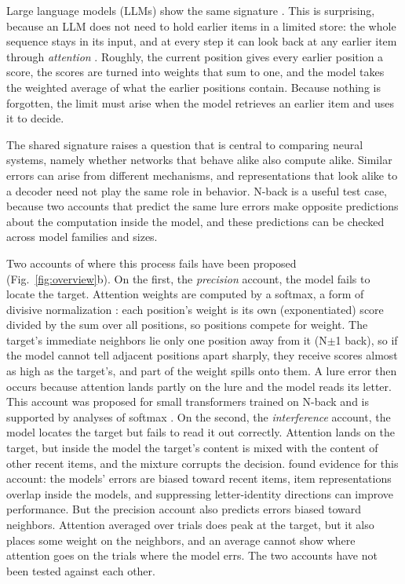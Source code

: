 \documentclass{article}
\begin{document}
Large language models (LLMs) show the same signature \citep{gong2024chatgpt,hu2025nback,xiong2026superposition}. This is surprising, because an LLM does not need to hold earlier items in a limited store: the whole sequence stays in its input, and at every step it can look back at any earlier item through \emph{attention} \citep{vaswani2017attention}. Roughly, the current position gives every earlier position a score, the scores are turned into weights that sum to one, and the model takes the weighted average of what the earlier positions contain. Because nothing is forgotten, the limit must arise when the model retrieves an earlier item and uses it to decide.

The shared signature raises a question that is central to comparing neural systems, namely whether networks that behave alike also compute alike. Similar errors can arise from different mechanisms, and representations that look alike to a decoder need not play the same role in behavior. N-back is a useful test case, because two accounts that predict the same lure errors make opposite predictions about the computation inside the model, and these predictions can be checked across model families and sizes.

Two accounts of where this process fails have been proposed (Fig.~\ref{fig:overview}b). On the first, the \emph{precision} account, the model fails to locate the target. Attention weights are computed by a softmax, a form of divisive normalization \citep{carandini2012normalization}: each position's weight is its own (exponentiated) score divided by the sum over all positions, so positions compete for weight. The target's immediate neighbors lie only one position away from it (N$\pm$1 back), so if the model cannot tell adjacent positions apart sharply, they receive scores almost as high as the target's, and part of the weight spills onto them. A lure error then occurs because attention lands partly on the lure and the model reads its letter. This account was proposed for small transformers trained on N-back \citep{gong2024selfattention} and is supported by analyses of softmax \citep{velickovic2025softmax}. On the second, the \emph{interference} account, the model locates the target but fails to read it out correctly. Attention lands on the target, but inside the model the target's content is mixed with the content of other recent items, and the mixture corrupts the decision. \citet{xiong2026superposition} found evidence for this account: the models' errors are biased toward recent items, item representations overlap inside the models, and suppressing letter-identity directions can improve performance. But the precision account also predicts errors biased toward neighbors. Attention averaged over trials does peak at the target, but it also places some weight on the neighbors, and an average cannot show where attention goes on the trials where the model errs. The two accounts have not been tested against each other.
\end{document}
